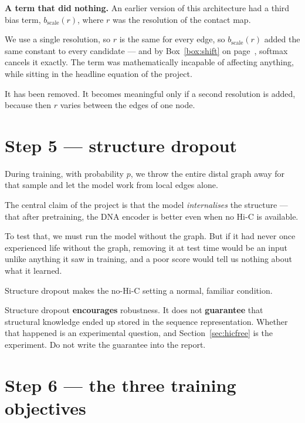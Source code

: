 \documentclass[11pt,a4paper]{article}
\begin{document}
\begin{carefulbox}
\textbf{A term that did nothing.} An earlier version of this architecture had a
third bias term, $b_{\mathrm{scale}}(r)$, where $r$ was the resolution of the
contact map.

We use a single resolution, so $r$ is the same for every edge, so
$b_{\mathrm{scale}}(r)$ added the same constant to every candidate --- and by
Box~\ref{box:shift} on page~\pageref{box:shift}, softmax cancels it exactly.
The term was mathematically incapable of affecting anything, while sitting in the
headline equation of the project.

It has been removed. It becomes meaningful only if a second resolution is added,
because then $r$ varies between the edges of one node.
\end{carefulbox}

\section{Step 5 --- structure dropout}

During training, with probability $p$, we throw the entire distal graph away for
that sample and let the model work from local edges alone.

\begin{whybox}
The central claim of the project is that the model \emph{internalises} the
structure --- that after pretraining, the DNA encoder is better even when no Hi-C
is available.

To test that, we must run the model without the graph. But if it had never once
experienced life without the graph, removing it at test time would be an input
unlike anything it saw in training, and a poor score would tell us nothing about
what it learned.

Structure dropout makes the no-Hi-C setting a normal, familiar condition.
\end{whybox}

\begin{carefulbox}
Structure dropout \textbf{encourages} robustness. It does not \textbf{guarantee}
that structural knowledge ended up stored in the sequence representation. Whether
that happened is an experimental question, and Section~\ref{sec:hicfree} is the
experiment. Do not write the guarantee into the report.
\end{carefulbox}

\section{Step 6 --- the three training objectives}
\end{document}
